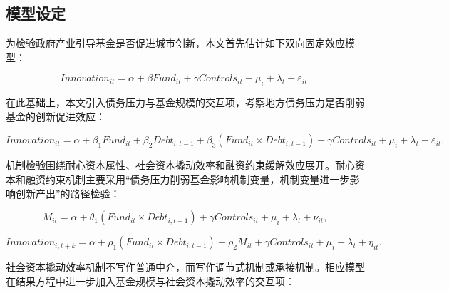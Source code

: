 \subsection{模型设定}

为检验政府产业引导基金是否促进城市创新，本文首先估计如下双向固定效应模型：

\begin{equation}
Innovation_{it}=\alpha+\beta Fund_{it}+\gamma Controls_{it}+\mu_i+\lambda_t+\varepsilon_{it}.
\end{equation}

在此基础上，本文引入债务压力与基金规模的交互项，考察地方债务压力是否削弱基金的创新促进效应：

\begin{equation}
Innovation_{it}=\alpha+\beta_1 Fund_{it}+\beta_2 Debt_{i,t-1}
+\beta_3(Fund_{it}\times Debt_{i,t-1})+\gamma Controls_{it}+\mu_i+\lambda_t+\varepsilon_{it}.
\end{equation}

机制检验围绕耐心资本属性、社会资本撬动效率和融资约束缓解效应展开。耐心资本和融资约束机制主要采用“债务压力削弱基金影响机制变量，机制变量进一步影响创新产出”的路径检验：

\begin{equation}
M_{it}=\alpha+\theta_1(Fund_{it}\times Debt_{i,t-1})+\gamma Controls_{it}+\mu_i+\lambda_t+\nu_{it},
\end{equation}

\begin{equation}
Innovation_{i,t+k}=\alpha+\rho_1(Fund_{it}\times Debt_{i,t-1})+\rho_2 M_{it}
+\gamma Controls_{it}+\mu_i+\lambda_t+\eta_{it}.
\end{equation}

社会资本撬动效率机制不写作普通中介，而写作调节式机制或承接机制。相应模型在结果方程中进一步加入基金规模与社会资本撬动效率的交互项：


